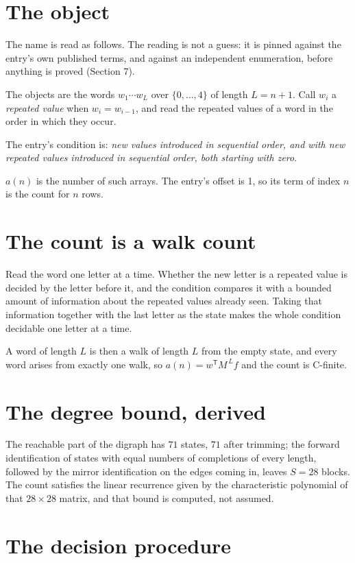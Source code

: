 \documentclass[11pt]{article}
\theoremstyle{definition}
\begin{document}
\section{The object}

The name is read as follows. The reading is not a guess: it is pinned against the entry's own published terms, and against an independent enumeration, before anything is proved (Section 7).

The objects are the words $w_1\cdots w_L$ over $\{0,\dots,4\}$ of length $L = n + 1$. Call $w_i$ a {\itshape repeated value} when $w_i = w_{i-1}$, and read the repeated values of a word in the order in which they occur.

The entry's condition is: {\itshape new values introduced in sequential order, and with new repeated values introduced in sequential order, both starting with zero}.

$a(n)$ is the number of such arrays. The entry's offset is 1, so its term of index $n$ is the count for $n$ rows.

\section{The count is a walk count}

Read the word one letter at a time. Whether the new letter is a repeated value is decided by the letter before it, and the condition compares it with a bounded amount of information about the repeated values already seen. Taking that information together with the last letter as the state makes the whole condition decidable one letter at a time.

A word of length $L$ is then a walk of length $L$ from the empty state, and every word arises from exactly one walk, so $a(n) = w^{\mathsf T}M^{\,L}f$ and the count is C-finite.

\section{The degree bound, derived}

The reachable part of the digraph has $71$ states, $71$ after trimming; the forward identification of states with equal numbers of completions of every length, followed by the mirror identification on the edges coming in, leaves $S = 28$ blocks. The count satisfies the linear recurrence given by the characteristic polynomial of that $28\times28$ matrix, and that bound is computed, not assumed.

\section{The decision procedure}
\end{document}
